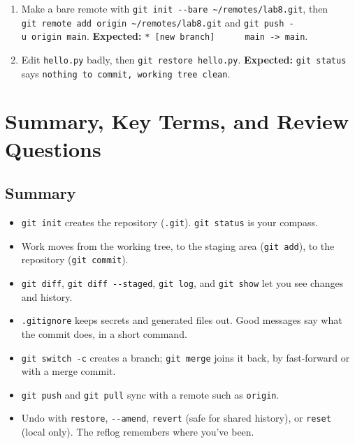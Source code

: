 \begin{enumerate}
\item
  Make a bare remote with \texttt{git\ init\ -}\allowbreak{}\texttt{-}\allowbreak{}\texttt{bare\ \textasciitilde{}/}\allowbreak{}\texttt{remotes/}\allowbreak{}\texttt{lab8.}\allowbreak{}\texttt{git}, then \texttt{git\ remote\ add\ origin\ \textasciitilde{}/}\allowbreak{}\texttt{remotes/}\allowbreak{}\texttt{lab8.}\allowbreak{}\texttt{git} and \texttt{git\ push\ -u\ origin\ main}. \textbf{Expected:} \texttt{*\ {[}new\ branch{]}\ \ \ \ \ \ main\ -}\allowbreak{}\texttt{\textgreater{}\ main}.
\item
  Edit \texttt{hello.py} badly, then \texttt{git\ restore\ hello.py}. \textbf{Expected:} \texttt{git\ status} says \texttt{nothing\ to\ commit,}\allowbreak{}\texttt{\ working\ tree\ clean}.
\end{enumerate}

\section{Summary, Key Terms, and Review Questions}\label{08-git-every-day:summary-key-terms-and-review-questions}

\subsection*{Summary}\label{08-git-every-day:summary}

\begin{itemize}
\tightlist
\item
  \texttt{git\ init} creates the repository (\texttt{.git}). \texttt{git\ status} is your compass.
\item
  Work moves from the working tree, to the staging area (\texttt{git\ add}), to the repository (\texttt{git\ commit}).
\item
  \texttt{git\ diff}, \texttt{git\ diff\ -\/-staged}, \texttt{git\ log}, and \texttt{git\ show} let you see changes and history.
\item
  \texttt{.gitignore} keeps secrets and generated files out. Good messages say what the commit does, in a short command.
\item
  \texttt{git\ switch\ -c} creates a branch; \texttt{git\ merge} joins it back, by fast-forward or with a merge commit.
\item
  \texttt{git\ push} and \texttt{git\ pull} sync with a remote such as \texttt{origin}.
\item
  Undo with \texttt{restore}, \texttt{-\/-amend}, \texttt{revert} (safe for shared history), or \texttt{reset} (local only). The reflog remembers where you've been.
\end{itemize}

